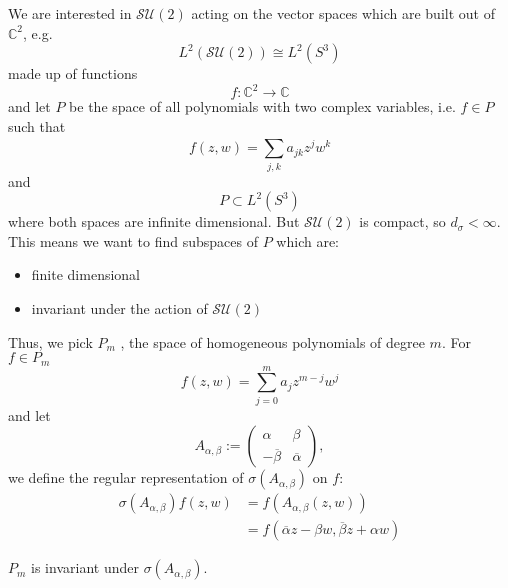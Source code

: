 \documentclass{article}
\begin{document}
We are interested in $\mathcal{SU}(2)$ acting on the vector spaces which are built out of $\mathbb{C}^{2}$, e.g.
\begin{equation}
    L^{2}(\mathcal{SU}(2)) \cong L^{2}(S^{3})
\end{equation}
made up of functions
\begin{equation}
    f : \mathbb{C}^{2} \rightarrow \mathbb{C}
\end{equation}
and let $P$ be the space of all polynomials with two complex variables, i.e. $f \in P$ such that
\begin{equation}
    f(z,w) = \sum_{j,k}^{} a_{jk} z^{j} w^{k}
\end{equation}
and 
\begin{equation}
    P \subset L^{2}(S^{3}) 
\end{equation}
where both spaces are infinite dimensional. But $\mathcal{SU}(2)$ is compact, so $d_{\sigma} < \infty$. This means we want to find subspaces of $P$ which are:
\begin{itemize}
    \item finite dimensional
    \item invariant under the action of $\mathcal{SU}(2)$
\end{itemize}

Thus, we pick $P_m$ , the space of homogeneous polynomials of degree $m$. For $f \in P_m$ 
\begin{equation}
    f(z,w) = \sum_{j=0}^{m} a_j z^{m-j} w^{j}
\end{equation}
and let 
\begin{equation}
    A_{\alpha, \beta} := 
    \begin{pmatrix}
        \alpha & \beta \\
        -\overline{\beta} & \overline{\alpha}
    \end{pmatrix},
\end{equation}
we define the regular representation of $\sigma(A_{\alpha,\beta})$ on $f$:
\begin{equation}
    \begin{split}
        \sigma(A_{\alpha, \beta})f(z,w) &= f(A_{\alpha,\beta}(z,w))\\
                                        &= f(\overline{\alpha} z - \beta w, 
                                             \overline{\beta}z + \alpha w)
    \end{split}
\end{equation}

\begin{theorem}
    $P_m$ is invariant under $\sigma(A_{\alpha,\beta})$.
\end{theorem}
\end{document}
